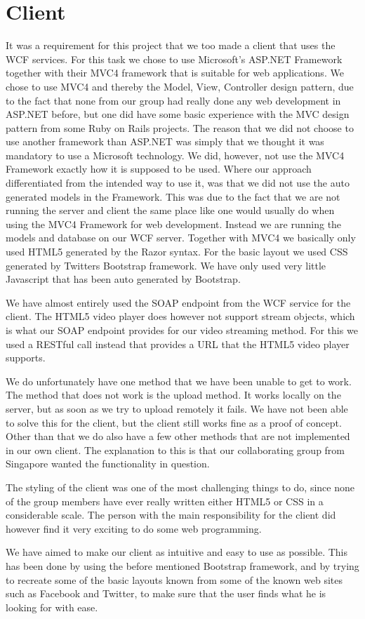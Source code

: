 \section{Client}

It was a requirement for this project that we too made a client that uses the WCF services. 
For this task we chose to use Microsoft's ASP.NET Framework together with their MVC4 framework
that is suitable for web applications. We chose to use MVC4 and thereby the Model, View, Controller
design pattern, due to the fact that none from our group had really done any web development in
ASP.NET before, but one did have some basic experience with the MVC design pattern from some 
Ruby on Rails projects. The reason that we did not choose to use another framework than ASP.NET
was simply that we thought it was mandatory to use a Microsoft technology. 
We did, however, not use the MVC4 Framework exactly how it is supposed to be used. Where our
approach differentiated from the intended way to use it, was that we did not use the auto generated
models in the Framework. This was due to the fact that we are not running the server and client
the same place like one would usually do when using the MVC4 Framework for web development. 
Instead we are running the models and database on our WCF server.
Together with MVC4 we basically only used HTML5 generated by the Razor syntax. For the 
basic layout we used CSS generated by Twitters Bootstrap framework. We have only used very little
Javascript that has been auto generated by Bootstrap.

We have almost entirely used the SOAP endpoint from the WCF service for the client. The HTML5 
video player does however not support stream objects, which is what our SOAP endpoint provides
for our video streaming method. For this we used a RESTful call instead that provides a
URL that the HTML5 video player supports.

We do unfortunately have one method that we have been unable to get to work. The method that
does not work is the upload method. It works locally on the server, but as soon as we try to
upload remotely it fails. We have not been able to solve this for the client, but the 
client still works fine as a proof of concept. Other than that we do also have a few other
methods that are not implemented in our own client. The explanation to this is that our
collaborating group from Singapore wanted the functionality in question.

The styling of the client was one of the most challenging things to do, since none of the 
group members have ever really written either HTML5 or CSS in a considerable scale. The person
with the main responsibility for the client did however find it very exciting to do some web 
programming.

We have aimed to make our client as intuitive and easy to use as possible. This has been done
by using the before mentioned Bootstrap framework, and by trying to recreate some of the basic
layouts known from some of the known web sites such as Facebook and Twitter, to make sure
that the user finds what he is looking for with ease.



